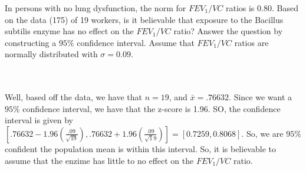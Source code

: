 In persons with no lung dysfunction, the norm for $FEV_1/VC$ ratios is 0.80. Based on the data (175) of
19 workers, is it believable that exposure to the Bacillus subtilis enzyme has no effect on the
$FEV_1/VC$ ratio? Answer the question by constructing a $95\%$ confidence interval. Assume that
$FEV_1/VC$ ratios are normally distributed with $\sigma=0.09$.\\\\

\begin{solution}\renewcommand{\qedsymbol}{}\ \\
    Well, based off the data, we have that $n=19$, and $\bar{x}=.76632$. Since we want a $95\%$
    confidence interval, we have that the z-score is 1.96. SO, the confidence interval is given by
    $[.76632-1.96(\frac{.09}{\sqrt{19}}),.76632+1.96(\frac{.09}{\sqrt19})]=[0.7259,0.8068]$. So, we are
    $95\%$ confident the population mean is within this interval. So, it is believable to assume that
    the enzime has little to no effect on the $FEV_1/VC$ ratio.

\end{solution}